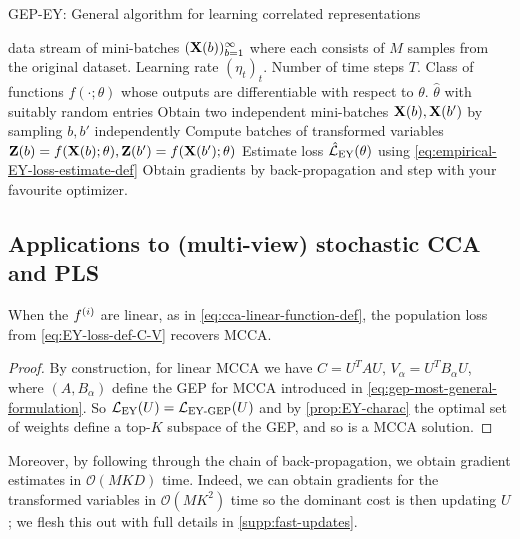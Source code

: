 \begin{algorithm}
    \caption{GEP-EY: General algorithm for learning correlated representations}
    \label{alg:general}
    \begin{algorithmic}
         data stream of mini-batches $(\mathbf{X}(b))_{b=1}^\infty$ where each consists of $M$ samples from the original dataset. Learning rate $(\eta_t)_t$. Number of time steps $T$. Class of functions $f(\cdot; \theta)$ whose outputs are differentiable with respect to $\theta$.
         $\hat{\theta}$ with suitably random entries
        \STATE Obtain two independent mini-batches \( \mathbf{X}(b), \mathbf{X}(b') \) by sampling \( b, b' \) independently
        \STATE Compute batches of transformed variables $\mathbf{Z}(b) = f(\mathbf{X}(b); \theta), \mathbf{Z}(b') = f(\mathbf{X}(b'); \theta)$
        \STATE Estimate loss $\hat{\mathcal{L}}_\text{EY}(\theta)$ using \cref{eq:empirical-EY-loss-estimate-def}
        \STATE Obtain gradients by back-propagation and step with your favourite optimizer.
        \ENDFOR
    \end{algorithmic}
\end{algorithm}

\subsection{Applications to (multi-view) stochastic CCA and PLS}
\begin{lemma}
    When the $f^{(i)}$ are linear, as in \ref{eq:cca-linear-function-def}, the population loss from \cref{eq:EY-loss-def-C-V} recovers MCCA.
\end{lemma}
\begin{proof}
    By construction, for linear MCCA we have $C = U^T A U,\, V_\alpha=U^T B_\alpha U$, where $(A, B_\alpha)$ define the GEP for MCCA introduced in \cref{eq:gep-most-general-formulation}.
    So $\mathcal{L}_\text{EY}(U) = \mathcal{L}_\text{EY-GEP}(U)$ and by \cref{prop:EY-charac} the optimal set of weights define a top-$K$ subspace of the GEP, and so is a MCCA solution.
\end{proof}

Moreover, by following through the chain of back-propagation, we obtain gradient estimates in $\mathcal{O}(MKD)$ time.
Indeed, we can obtain gradients for the transformed variables in $\mathcal{O}(M K^2)$ time so the dominant cost is then updating $U$; we flesh this out with full details in \cref{supp:fast-updates}.

